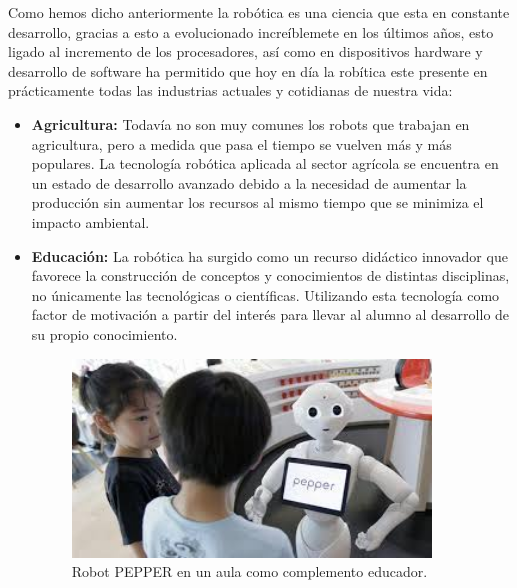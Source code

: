 \hspace{1cm} Como hemos dicho anteriormente la robótica es una ciencia que esta en constante desarrollo, gracias a esto a evolucionado increíblemete en los últimos años, esto ligado al incremento de los procesadores, así como en dispositivos hardware y desarrollo de software ha permitido que hoy en día la robítica este presente en prácticamente todas las industrias actuales y cotidianas de nuestra vida:
\begin{itemize}
		\item \textbf{Agricultura: }Todavía no son muy comunes los robots que trabajan en agricultura, pero a medida que pasa el tiempo se vuelven más y más populares. La tecnología robótica aplicada al sector agrícola se encuentra en un estado de desarrollo avanzado debido a la necesidad de aumentar la producción sin aumentar los recursos al mismo tiempo que se minimiza el impacto ambiental.
		\item \textbf{Educación: }La robótica ha surgido como un recurso didáctico innovador que favorece la construcción de conceptos y conocimientos de distintas disciplinas, no únicamente las tecnológicas o científicas.  Utilizando esta tecnología como factor de motivación a partir del interés para llevar al alumno al desarrollo de su propio conocimiento.
		\begin{figure}[H]
			\begin{center}
				\includegraphics[width=0.9\textwidth]{imag/IMG12.jpeg}
					\caption{Robot PEPPER en un aula como complemento educador.}
			\label{fig:Robot PEPPER.}	
			\end{center}
		\end{figure}


\end{itemize}
